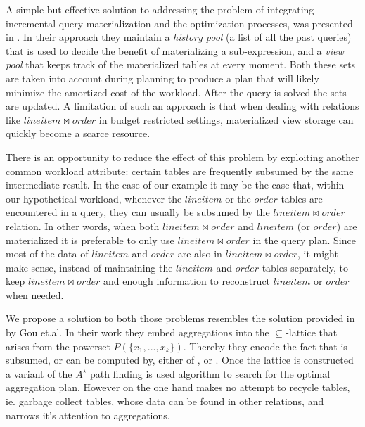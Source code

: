 A simple but effective solution to addressing the problem of
integrating incremental query materialization and the optimization
processes, was presented in
\cite{perezHistoryawareQueryOptimization}. In their approach they
maintain a \emph{history pool} (a list of all the past queries) that is
used to decide the benefit of materializing a sub-expression, and a
\emph{view pool} that keeps track of the materialized tables at every
moment. Both these sets are taken into account during planning to
produce a plan that will likely minimize the amortized cost of the
workload. After the query is solved the sets are updated. A limitation
of such an approach is that when dealing with relations like
\(lineitem \Join order\) in budget restricted settings, materialized
view storage can quickly become a scarce resource.

There is an opportunity to reduce the effect of this problem by
exploiting another common workload attribute: certain tables are
frequently subsumed by the same intermediate result. In the case of
our example it may be the case that, within our hypothetical workload,
whenever the \(lineitem\) or the \(order\) tables are encountered in a
query, they can usually be subsumed by the \(lineitem \Join order\)
relation. In other words, when both \(lineitem \Join order\) and
\(lineitem\) (or \(order\)) are materialized it is preferable to only use
\(lineitem \Join order\) in the query plan. Since most of the data of
\(lineitem\) and \(order\) are also in \(lineitem \Join order\), it might
make sense, instead of maintaining the \(lineitem\) and \(order\) tables
separately, to keep \(lineitem \Join order\) and enough information to
reconstruct \(lineitem\) or \(order\) when needed.

We propose a solution to both those problems resembles the solution
provided in \cite{gouSupSearchEfficient2006} by Gou et.al. In their work
they embed aggregations  into the
\(\subseteq\)-lattice that arises from the powerset \(P(\{x_1, ...,
x_k\})\). Thereby they encode the fact that  is
subsumed, or can be computed by, either of ,  or . Once the lattice is constructed a variant of
the \(A^{\star}\) path finding is used algorithm to search for the
optimal aggregation plan. However \cite{gouSupSearchEfficient2006} on
the one hand makes no attempt to recycle tables, ie. garbage collect
tables, whose data can be found in other relations, and narrows it's
attention to aggregations.

